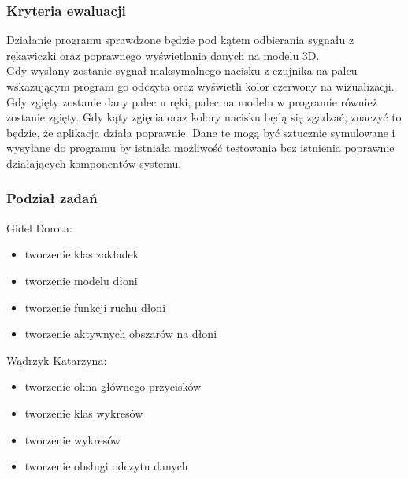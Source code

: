 \documentclass{article}
\begin{document}
\subsubsection{Kryteria ewaluacji}
Działanie programu sprawdzone będzie pod kątem odbierania sygnału z rękawiczki oraz poprawnego wyświetlania danych na modelu 3D. \\
Gdy wysłany zostanie sygnał maksymalnego nacisku z czujnika na palcu wskazującym program go odczyta oraz wyświetli kolor czerwony na wizualizacji. Gdy zgięty zostanie dany palec u ręki, palec na modelu w programie również zostanie zgięty. Gdy kąty zgięcia oraz kolory nacisku będą się zgadzać, znaczyć to będzie, że aplikacja działa poprawnie. Dane te mogą być sztucznie symulowane i wysyłane do programu by istniała możliwość testowania bez istnienia poprawnie działających komponentów systemu.
\subsubsection{Podział zadań}
Gidel Dorota:
\begin{itemize}
    \item tworzenie klas zakładek
    \item tworzenie modelu dłoni
    \item tworzenie funkcji ruchu dłoni
    \item tworzenie aktywnych obszarów na dłoni
\end{itemize}
Wądrzyk Katarzyna:
\begin{itemize}
    \item tworzenie okna głównego przycisków
    \item tworzenie klas wykresów
    \item tworzenie wykresów
    \item tworzenie obsługi odczytu danych
\end{itemize}
\end{document}
